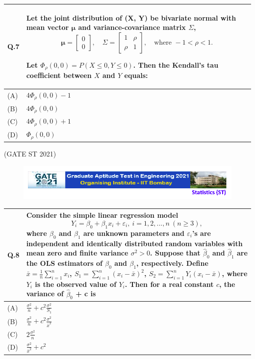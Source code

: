 \documentclass[journal,12pt,onecolumn]{IEEEtran}
\theoremstyle{remark}
\begin{document}
\begin{tabular}{|p{1cm}|p{16cm}|}
\hline
\textbf{Q.7}  & Let the joint distribution of (X, Y) be bivariate normal with mean vector $\boldsymbol{\mu}$ and variance-covariance matrix $\Sigma$,
$$
\boldsymbol{\mu} = \begin{bmatrix} 0 \\ 0 \end{bmatrix}, \quad 
\Sigma = \begin{bmatrix}
1 & \rho \\
\rho & 1
\end{bmatrix}, \quad \text{where } -1 < \rho < 1.
$$

Let $\Phi_{\rho}(0,0) = P(X \leq 0, Y \leq 0)$. Then the Kendall's tau coefficient between $X$ and $Y$ equals: \\
\hline
(A) & $4\Phi_{\rho}(0,0) - 1$ \\
\hline
(B) & $4\Phi_{\rho}(0,0)$ \\
\hline
(C) & $4\Phi_{\rho}(0,0) + 1$ \\
\hline
(D) & $\Phi_{\rho}(0,0)$ \\
\hline
\end{tabular}


\hfill (GATE ST 2021)
 \newpage
\begin{figure}
\huge\centering
    \includegraphics[width=1\linewidth]{figs/0.png}
\end{figure}
 
\begin{tabular}{|p{1cm}|p{12.5cm}|}
\hline

\textbf{Q.8} & Consider the simple linear regression model
$$ Y_i = \beta_0 + \beta_1 x_i + \varepsilon_i,\ i=1,2,...,n\ (n\geq3),$$
where $\beta_0$ and $\beta_1$ are unknown parameters and $\varepsilon_i$'s are independent and identically distributed random variables with mean zero and finite variance $\sigma^2>0$. Suppose that $\hat{\beta}_0$ and $\hat{\beta}_1$ are the OLS estimators of $\beta_0$ and $\beta_1$, respectively. Define  $\bar{x} = \frac{1}{n}\sum_{i=1}^n x_i$, \quad $S_1 = \sum_{i=1}^n (x_i-\bar{x})^2$, \quad $S_2=\sum_{i=1}^n Y_i(x_i-\bar{x})$, \quad where $Y_i$ is the observed value of $Y_i$.
Then for a real constant $c$, the variance of $\hat{\beta}_0$ + c is
\\
\hline

(A) & $\frac{\sigma^2}{n} + c^2 \frac{\sigma^2}{S_1}$\\
\hline
(B) & $\frac{\sigma^2}{n} + c^2 \frac{\sigma^2}{\bar{x}^2}$\\
\hline
(C) & $2\frac{\sigma^2}{n}$\\
\hline
(D) & $\frac{\sigma^2}{\bar{x}^2} + c^2$\\
\hline
\end{tabular}
\end{document}
